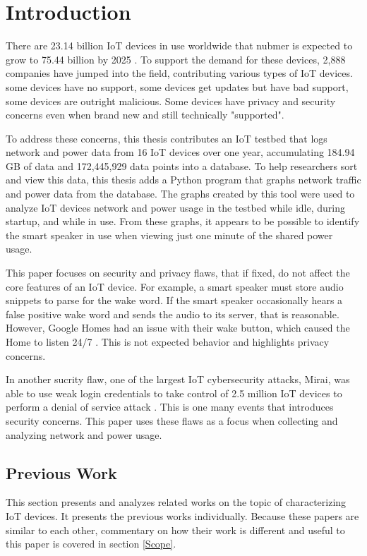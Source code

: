 \chapter{Introduction}
\label{Introduction}
There are 23.14 billion IoT devices in use worldwide that nubmer is expected to grow to 75.44 billion by 2025 \cite{statista_2016}. To support the demand for these devices, 2,888 companies have jumped into the field, contributing various types of IoT devices. some devices have no support, some devices get updates but have bad support, some devices are outright malicious. Some devices have privacy and security concerns even when brand new and still technically "supported".

To address these concerns, this thesis contributes an IoT testbed that logs network and power data from 16 IoT devices over one year, accumulating 184.94 GB of data and 172,445,929 data points into a database. To help researchers sort and view this data, this thesis adds a Python \cite{python} program that graphs network traffic and power data from the database. The graphs created by this tool were used to analyze IoT devices network and power usage in the testbed while idle, during startup, and while in use. From these graphs, it appears to be possible to identify the smart speaker in use when viewing just one minute of the shared power usage.

This paper focuses on security and privacy flaws, that if fixed, do not affect the core features of an IoT device. For example, a smart speaker must store audio snippets to parse for the wake word. If the smart speaker occasionally hears a false positive wake word and sends the audio to its server, that is reasonable. However, Google Homes had an issue with their wake button, which caused the Home to listen 24/7 \cite{burke_2017}. This is not expected behavior and highlights privacy concerns.

In another sucrity flaw, one of the largest IoT cybersecurity attacks, Mirai, was able to use weak login credentials to take control of 2.5 million IoT devices to perform a denial of service attack \cite{whittaker_2017}. This is one many events that introduces security concerns. This paper uses these flaws as a focus when collecting and analyzing network and power usage.

\section{Previous Work}
\label{Previous Work}
This section presents and analyzes related works on the topic of characterizing IoT devices. It presents the previous works individually. Because these papers are similar to each other, commentary on how their work is different and useful to this paper is covered in section \ref{Scope}.

